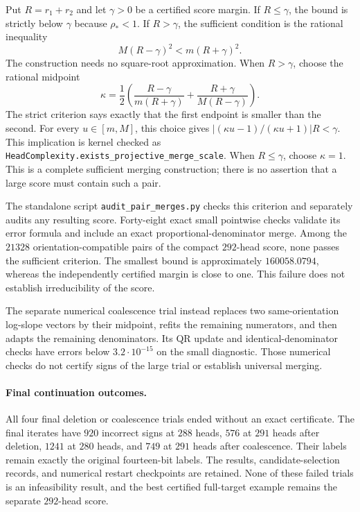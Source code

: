 \documentclass[11pt]{article}
\begin{document}
Put $R=r_1+r_2$ and let $\gamma>0$ be a certified score margin.
If $R\le\gamma$, the bound is strictly below $\gamma$ because
$\rho_*<1$. If $R>\gamma$, the sufficient condition is the rational
inequality
\[
 M(R-\gamma)^2<m(R+\gamma)^2.
\]
The construction needs no square-root approximation. When $R>\gamma$,
choose the rational midpoint
\[
 \kappa=\frac12\left(
 \frac{R-\gamma}{m(R+\gamma)}+
 \frac{R+\gamma}{M(R-\gamma)}\right).
\]
The strict criterion says exactly that the first endpoint is smaller
than the second. For every $u\in[m,M]$, this choice gives
$|(\kappa u-1)/(\kappa u+1)|R<\gamma$.
This implication is kernel checked as
\texttt{HeadComplexity.exists\_projective\_merge\_scale}.
When $R\le\gamma$, choose $\kappa=1$.
This is a complete sufficient merging construction;
there is no assertion that a large score must contain such a pair.

The standalone script \texttt{audit\_pair\_merges.py} checks this
criterion and separately audits any resulting score. Forty-eight
exact small pointwise checks validate its error formula and include
an exact proportional-denominator merge. Among the $21328$
orientation-compatible pairs of the compact $292$-head score, none
passes the sufficient criterion. The smallest bound is approximately
$160058.0794$, whereas the independently certified margin is close
to one. This failure does not establish irreducibility of the score.

The separate numerical coalescence trial instead replaces two
same-orientation log-slope vectors by their midpoint, refits the
remaining numerators, and then adapts the remaining denominators.
Its QR update and identical-denominator checks have errors below
$3.2\cdot10^{-15}$ on the small diagnostic. Those numerical checks
do not certify signs of the large trial or establish universal merging.

\paragraph{Final continuation outcomes.}
All four final deletion or coalescence trials ended without an exact
certificate. The final iterates have $920$ incorrect signs at $288$
heads, $576$ at $291$ heads after deletion, $1241$ at $280$ heads,
and $749$ at $291$ heads after coalescence. Their labels remain exactly
the original fourteen-bit labels. The results, candidate-selection
records, and numerical restart checkpoints are retained. None of these
failed trials is an infeasibility result, and the best certified
full-target example remains the separate $292$-head score.
\end{document}
